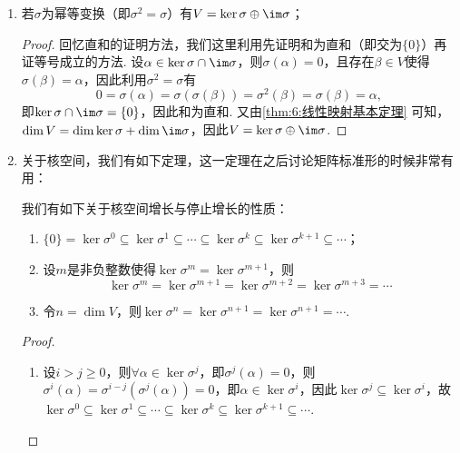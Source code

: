 \begin{enumerate}
    \item \label{item:6:像与核的进一步讨论:1}
          若$\sigma$为幂等变换（即$\sigma^2=\sigma$）有$V=\ker\sigma\oplus\im \sigma$；

          \begin{proof}
              回忆直和的证明方法，我们这里利用先证明和为直和（即交为$\{0\}$）再证等号成立的方法. 设$\alpha\in\ker\sigma\cap\im \sigma$，则$\sigma(\alpha)=0$，且存在$\beta\in V$使得$\sigma(\beta)=\alpha$，因此利用$\sigma^2=\sigma$有
              \[0=\sigma(\alpha)=\sigma(\sigma(\beta))=\sigma^2(\beta)=\sigma(\beta)=\alpha,\]
              即$\ker\sigma\cap\im \sigma=\{0\}$，因此和为直和. 又由\autoref{thm:6:线性映射基本定理} 可知，$\dim V=\dim\ker\sigma+\dim\im \sigma$，因此$V=\ker\sigma\oplus\im \sigma$.
          \end{proof}

    \item 关于核空间，我们有如下定理，这一定理在之后讨论矩阵标准形的时候非常有用：
          \begin{theorem} \label{thm:6:核空间性质}
              我们有如下关于核空间增长与停止增长的性质：
              \begin{enumerate}
                  \item $\{0\}=\ker \sigma^0\subseteq\ker \sigma^1\subseteq\cdots\subseteq \ker \sigma^k\subseteq\ker \sigma^{k+1}\subseteq\cdots$；

                  \item 设$m$是非负整数使得$\ker \sigma^m=\ker \sigma^{m+1}$，则
                        \[\ker \sigma^m=\ker \sigma^{m+1}=\ker \sigma^{m+2}=\ker \sigma^{m+3}=\cdots\]

                  \item 令$n=\dim V$，则$\ker \sigma^n=\ker \sigma^{n+1}=\ker \sigma^{n+1}=\cdots$.
              \end{enumerate}
          \end{theorem}

          \begin{proof}
              \begin{enumerate}
                  \item 设$i>j\geqslant 0$，则$\forall\alpha\in\ker\sigma^j$，即$\sigma^j(\alpha)=0$，则$\sigma^i(\alpha)=\sigma^{i-j}(\sigma^j(\alpha))=0$，即$\alpha\in\ker\sigma^i$，因此$\ker\sigma^j\subseteq\ker\sigma^i$，故$\ker \sigma^0\subseteq\ker \sigma^1\subseteq\cdots\subseteq \ker \sigma^k\subseteq\ker \sigma^{k+1}\subseteq\cdots$.


\end{enumerate}
\end{proof}
\end{enumerate}
